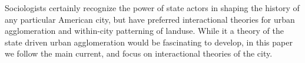 Sociologists certainly recognize the power of state actors in shaping
the history of any particular American city, but have preferred
interactional theories for urban agglomeration and within-city
patterning of landuse. While it a theory of the state driven urban
agglomeration would be fascinating to develop, in this paper we follow
the main current, and focus on interactional theories of the city.


